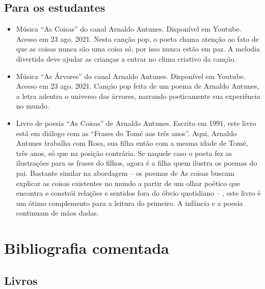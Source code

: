 \documentclass[11pt]{extarticle}
\begin{document}
\subsection{Para os estudantes}
\begin{itemize}
\item Música ``As Coisas'' do canal Arnaldo Antunes. Disponível em Youtube. Acesso em 23 ago. 2021. 
Nesta canção pop, o poeta chama atenção ao fato de que as coisas nunca são uma coisa só,
por isso nunca estão em paz. A melodia divertida deve ajudar as crianças a entrar no clima
criativo da canção. 

\item Música ``As Árvores'' do canal Arnaldo Antunes. Disponível em Youtube. Acesso em 23 ago. 2021.
Canção pop feita de um poema de Arnaldo Antunes, a letra adentra o universo das árvores, 
narrando poeticamente sua experiência no mundo. 

\item Livro de poesia ``As Coisas'' de Arnaldo Antunes. Escrito em 1991, este livro está em 
diálogo com as “Frases do Tomé aos três anos”. Aqui, Arnaldo Antunes trabalha com Rosa, sua 
filha então com a mesma idade de Tomé, três anos, só que na posição contrária. Se naquele 
caso o poeta fez as ilustrações para as frases do filhos, agora é a filha quem ilustra os 
poemas do pai. Bastante similar na abordagem – os poemas de As coisas buscam explicar as 
coisas existentes no mundo a partir de um olhar poético que encontra e constrói relações 
e sentidos fora do óbvio quotidiano – , este livro é um ótimo complemento para a leitura 
do primeiro. A infância e a poesia continuam de mãos dadas. 

\end{itemize}


\section{Bibliografia comentada}

\subsection{Livros}
\end{document}

